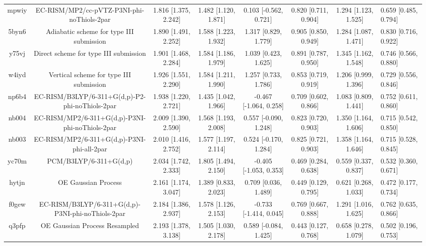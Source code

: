 \documentclass{article}
\begin{document}
\begin{center}
\begin{longtable}{|ccccccc|}
 mpwiy &         EC-RISM/MP2/cc-pVTZ-P3NI-phi-noThiols-2par &  1.816 [1.375, 2.242] &  1.482 [1.120, 1.871] &    0.103 [-0.562, 0.721] &  0.820 [0.711, 0.904] &   1.294 [1.123, 1.525] &   0.659 [0.485, 0.794] \\
 5byn6 &           Adiabatic scheme for type III submission &  1.890 [1.491, 2.252] &  1.588 [1.223, 1.932] &     1.317 [0.829, 1.779] &  0.905 [0.850, 0.949] &   1.284 [1.087, 1.471] &   0.830 [0.716, 0.922] \\
 y75vj &              Direct scheme for type III submission &  1.901 [1.468, 2.284] &  1.584 [1.186, 1.979] &     1.039 [0.423, 1.625] &  0.891 [0.787, 0.950] &   1.345 [1.162, 1.548] &   0.746 [0.566, 0.880] \\
 w4iyd &            Vertical scheme for type III submission &  1.926 [1.551, 2.290] &  1.584 [1.211, 1.990] &     1.257 [0.733, 1.786] &  0.853 [0.719, 0.919] &   1.206 [0.999, 1.396] &   0.729 [0.556, 0.846] \\
 np6b4 &    EC-RISM/B3LYP/6-311+G(d,p)-P2-phi-noThiols-2par &  1.938 [1.220, 2.721] &  1.435 [1.042, 1.966] &   -0.467 [-1.064, 0.258] &  0.709 [0.602, 0.866] &   1.083 [0.809, 1.441] &   0.752 [0.611, 0.860] \\
 nb004 &    EC-RISM/MP2/6-311+G(d,p)-P3NI-phi-noThiols-2par &  2.009 [1.390, 2.590] &  1.568 [1.193, 2.008] &    0.557 [-0.090, 1.248] &  0.823 [0.720, 0.903] &   1.350 [1.164, 1.606] &   0.715 [0.542, 0.850] \\
 nb003 &         EC-RISM/MP2/6-311+G(d,p)-P3NI-phi-all-2par &  2.010 [1.416, 2.752] &  1.577 [1.197, 2.114] &    0.524 [-0.170, 1.284] &  0.825 [0.721, 0.903] &   1.358 [1.164, 1.646] &   0.715 [0.528, 0.845] \\
 yc70m &                             PCM/B3LYP/6-311+G(d,p) &  2.034 [1.742, 2.333] &  1.805 [1.494, 2.150] &   -0.405 [-1.053, 0.353] &  0.469 [0.284, 0.638] &   0.559 [0.337, 0.837] &   0.532 [0.360, 0.671] \\
 hytjn &                                OE Gaussian Process &  2.161 [1.174, 3.047] &  1.389 [0.833, 2.023] &     0.709 [0.036, 1.489] &  0.449 [0.129, 0.795] &   0.621 [0.268, 1.033] &   0.472 [0.177, 0.734] \\
 f0gew &  EC-RISM/B3LYP/6-311+G(d,p)-P3NI-phi-noThiols-2par &  2.184 [1.386, 2.937] &  1.578 [1.126, 2.153] &   -0.733 [-1.414, 0.045] &  0.769 [0.667, 0.888] &   1.291 [1.016, 1.625] &   0.762 [0.635, 0.866] \\
 q3pfp &                      OE Gaussian Process Resampled &  2.193 [1.378, 3.138] &  1.505 [1.030, 2.178] &    0.589 [-0.084, 1.425] &  0.443 [0.127, 0.768] &   0.658 [0.278, 1.079] &   0.502 [0.196, 0.753] \\

\end{longtable}
\end{center}
\end{document}
